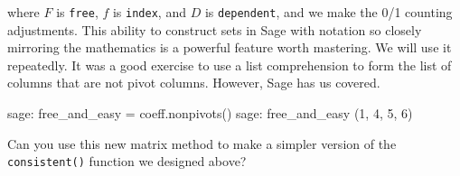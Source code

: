 %
where $F$ is \verb?free?, $f$ is \verb?index?, and $D$ is \verb?dependent?, and we make the 0/1 counting adjustments.  This ability to construct sets in Sage with notation so closely mirroring the mathematics is a powerful feature worth mastering.  We will use it repeatedly.
%
It was a good exercise to use a list comprehension to form the list of columns that are not pivot columns.  However, Sage has us covered.
%
\begin{sageexample}
sage: free_and_easy = coeff.nonpivots()
sage: free_and_easy
(1, 4, 5, 6)
\end{sageexample}
%
Can you use this new matrix method to make a simpler version of the \verb?consistent()? function we designed above?


%
\begin{sageverbatim}
\end{sageverbatim}
%